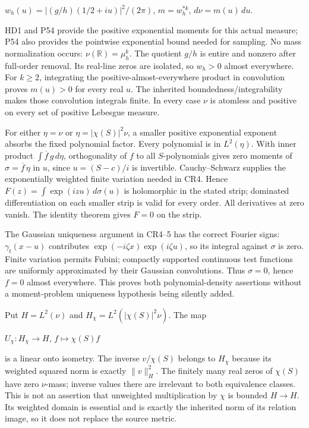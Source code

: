 \documentclass{article}
\begin{document}
\(w_h(u)=|(g/h)(1/2+iu)|^2/(2\pi)\), \(m=w_h^{*k}\), \(d\nu=m(u)\,du\).

HD1 and P54 provide the positive exponential moments for this actual measure; P54 also provides the pointwise exponential bound needed for sampling. No mass normalization occurs: \(\nu(\mathbb R)=\mu_h^k\). The quotient \(g/h\) is entire and nonzero after full-order removal. Its real-line zeros are isolated, so \(w_h>0\) almost everywhere. For \(k\ge2\), integrating the positive-almost-everywhere product in convolution proves \(m(u)>0\) for every real \(u\). The inherited boundedness/integrability makes those convolution integrals finite. In every case \(\nu\) is atomless and positive on every set of positive Lebesgue measure.

For either \(\eta=\nu\) or \(\eta=|\chi(S)|^2\nu\), a smaller positive exponential exponent absorbs the fixed polynomial factor. Every polynomial is in \(L^2(\eta)\). With inner product \(\int\overline f\,g\,d\eta\), orthogonality of \(f\) to all \(S\)-polynomials gives zero moments of \(\sigma=\overline f\,\eta\) in \(u\), since \(u=(S-c)/i\) is invertible. Cauchy--Schwarz supplies the exponentially weighted finite variation needed in CR4. Hence \(F(z)=\int\exp(izu)\,d\sigma(u)\) is holomorphic in the stated strip; dominated differentiation on each smaller strip is valid for every order. All derivatives at zero vanish. The identity theorem gives \(F=0\) on the strip.

The Gaussian uniqueness argument in CR4--5 has the correct Fourier signs: \(\gamma_t(x-u)\) contributes \(\exp(-i\zeta x)\exp(i\zeta u)\), so its integral against \(\sigma\) is zero. Finite variation permits Fubini; compactly supported continuous test functions are uniformly approximated by their Gaussian convolutions. Thus \(\sigma=0\), hence \(f=0\) almost everywhere. This proves both polynomial-density assertions without a moment-problem uniqueness hypothesis being silently added.

Put \(H=L^2(\nu)\) and \(H_\chi=L^2(|\chi(S)|^2\nu)\). The map

\(U_\chi:H_\chi\longrightarrow H\), \(f\longmapsto\chi(S)f\)

is a linear onto isometry. The inverse \(v/\chi(S)\) belongs to \(H_\chi\) because its weighted squared norm is exactly \(\|v\|_H^2\). The finitely many real zeros of \(\chi(S)\) have zero \(\nu\)-mass; inverse values there are irrelevant to both equivalence classes. This is not an assertion that unweighted multiplication by \(\chi\) is bounded \(H\longrightarrow H\). Its weighted domain is essential and is exactly the inherited norm of its relation image, so it does not replace the source metric.
\end{document}
